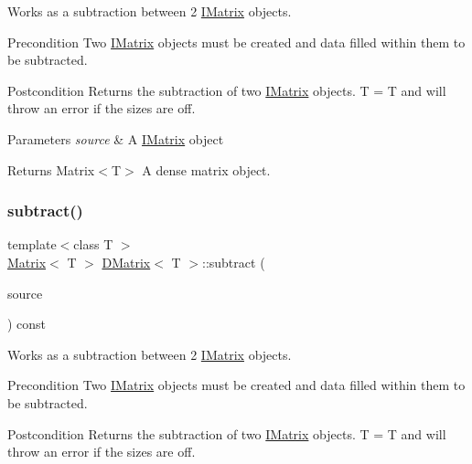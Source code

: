 Works as a subtraction between 2 \mbox{\hyperlink{class_i_matrix}{I\+Matrix}} objects. 

\begin{DoxyPrecond}{Precondition}
Two \mbox{\hyperlink{class_i_matrix}{I\+Matrix}} objects must be created and data filled within them to be subtracted. 
\end{DoxyPrecond}
\begin{DoxyPostcond}{Postcondition}
Returns the subtraction of two \mbox{\hyperlink{class_i_matrix}{I\+Matrix}} objects. T = T and will throw an error if the sizes are off.
\end{DoxyPostcond}

\begin{DoxyParams}{Parameters}
{\em source} & A \mbox{\hyperlink{class_i_matrix}{I\+Matrix}} object \\
\hline
\end{DoxyParams}
\begin{DoxyReturn}{Returns}
Matrix$<$\+T$>$ A dense matrix object. 
\end{DoxyReturn}
\mbox{\label{class_d_matrix_a8226018d72004cdbf1c575302b2ddd79}} 
\subsubsection{\texorpdfstring{subtract()}{subtract()}\hspace{0.1cm}{\footnotesize\ttfamily [3/6]}}
{\footnotesize\ttfamily template$<$class T $>$ \\
\mbox{\hyperlink{class_matrix}{Matrix}}$<$ T $>$ \mbox{\hyperlink{class_d_matrix}{D\+Matrix}}$<$ T $>$\+::subtract (\begin{DoxyParamCaption}\item[{const \mbox{\hyperlink{class_i_matrix}{I\+Matrix}}$<$ \mbox{\hyperlink{class_l_matrix}{L\+Matrix}}$<$ T $>$, T $>$ \&}]{source }\end{DoxyParamCaption}) const}



Works as a subtraction between 2 \mbox{\hyperlink{class_i_matrix}{I\+Matrix}} objects. 

\begin{DoxyPrecond}{Precondition}
Two \mbox{\hyperlink{class_i_matrix}{I\+Matrix}} objects must be created and data filled within them to be subtracted. 
\end{DoxyPrecond}
\begin{DoxyPostcond}{Postcondition}
Returns the subtraction of two \mbox{\hyperlink{class_i_matrix}{I\+Matrix}} objects. T = T and will throw an error if the sizes are off.
\end{DoxyPostcond}


